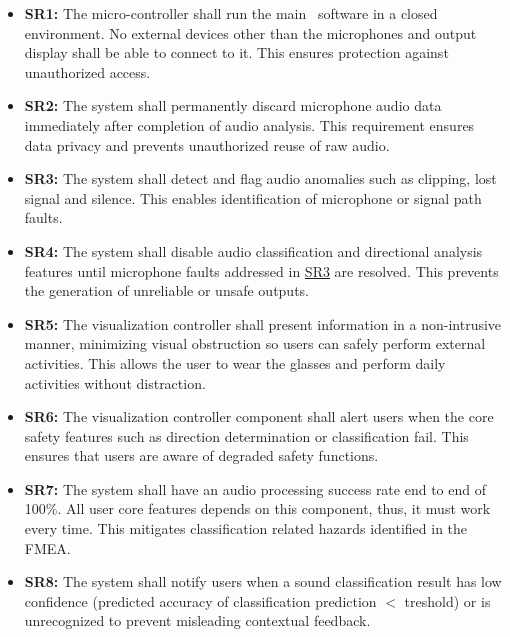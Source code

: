 \documentclass{article}
\begin{document}
\begin{itemize}
    \item \label{SR1}\textbf{SR1:} The micro-controller shall run the main
    \progname ~software in a closed environment. No external devices other than
    the microphones and output display shall be able to connect to it. This
    ensures protection against unauthorized access.

    \item \label{SR2}\textbf{SR2:} The system shall permanently discard
    microphone audio data immediately after completion of audio analysis. This
    requirement ensures data privacy and prevents unauthorized reuse of raw
    audio.

    \item \label{SR3}\textbf{SR3:} The system shall detect and flag audio
    anomalies such as clipping, lost signal and silence. This enables
    identification of microphone or signal path faults.

    \item \label{SR4}\textbf{SR4:} The system shall disable audio classification
    and directional analysis features until microphone faults addressed in
    \hyperref[SR3]{SR3} are resolved. This prevents the generation of unreliable
    or unsafe outputs.

    \item \label{SR5}\textbf{SR5:} The visualization controller shall present
    information in a non-intrusive manner, minimizing visual
    obstruction so users can safely perform external activities. This allows the
    user to wear the glasses and perform daily activities without distraction.

    \item \label{SR6}\textbf{SR6:} The visualization controller component shall
    alert users when the core safety features such as direction
    determination or classification fail. This ensures that users are aware of
    degraded safety functions.

    \item \label{SR7}\textbf{SR7:} The system shall have an audio processing
    success rate end to end of 100\%. All user core features depends on this
    component, thus, it must work every time. This mitigates classification
    related hazards identified in the FMEA.

    \item \label{SR8}\textbf{SR8:} The system shall
    notify users when a sound classification result has low confidence
    (predicted accuracy of classification prediction $<$ treshold) or is
    unrecognized to prevent misleading contextual feedback.


\end{itemize}
\end{document}
